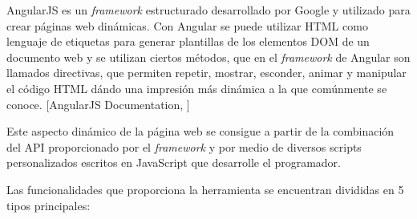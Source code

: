 AngularJS es un \textit{framework} estructurado desarrollado por Google y utilizado para crear páginas web dinámicas. Con Angular se puede utilizar HTML como lenguaje de etiquetas para generar plantillas de los elementos DOM de un documento web y se utilizan ciertos métodos, que en el \textit{framework} de Angular son llamados directivas, que permiten repetir, mostrar, esconder, animar y manipular el código HTML dándo una impresión más dinámica a la que comúnmente se conoce. [AngularJS Documentation, \cite{angularjsdocs}]

Este aspecto dinámico de la página web se consigue a partir de la combinación del API proporcionado por el \textit{framework} y por medio de diversos scripts personalizados escritos en JavaScript que desarrolle el programador.

Las funcionalidades que proporciona la herramienta se encuentran divididas en 5 tipos principales:

